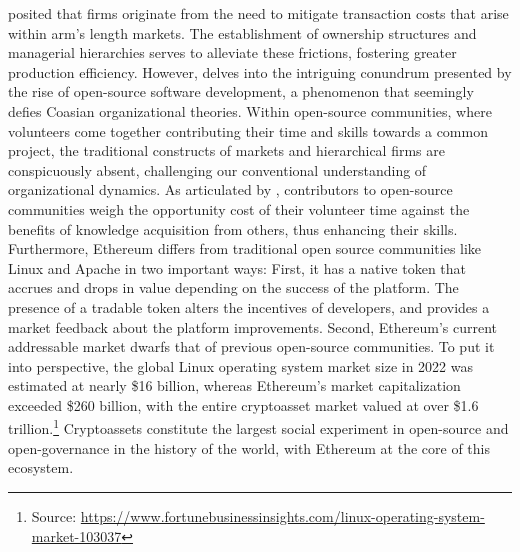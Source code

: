 \documentclass[No]{AEA}
\begin{document}
\cite{Coase1937} posited that firms originate from the need to mitigate transaction costs that arise within arm's length markets. The establishment of ownership structures and managerial hierarchies serves to alleviate these frictions, fostering greater production efficiency. However, \cite{Benkler2002} delves into the intriguing conundrum presented by the rise of open-source software development, a phenomenon that seemingly defies Coasian organizational theories. Within open-source communities, where volunteers come together contributing their time and skills towards a common project, the traditional constructs of markets and hierarchical firms are conspicuously absent, challenging our conventional understanding of organizational dynamics. As articulated by \cite{LernerTirole2005}, contributors to open-source communities weigh the opportunity cost of their volunteer time against the benefits of knowledge acquisition from others, thus enhancing their skills. Furthermore, Ethereum differs from traditional open source communities like Linux and Apache in two important ways: First, it has a native token that accrues and drops in value depending on the success of the platform. The presence of a tradable token alters the incentives of developers, and provides a market feedback about the platform improvements. Second, Ethereum's current addressable market dwarfs that of previous open-source communities. To put it into perspective, the global Linux operating system market size in 2022 was estimated at nearly \$16 billion, whereas Ethereum's market capitalization exceeded \$260 billion, with the entire cryptoasset market valued at over \$1.6 trillion.\footnote{Source: \url{https://www.fortunebusinessinsights.com/linux-operating-system-market-103037}} Cryptoassets constitute the largest social experiment in open-source and open-governance in the history of the world, with Ethereum at the core of this ecosystem.
\end{document}
